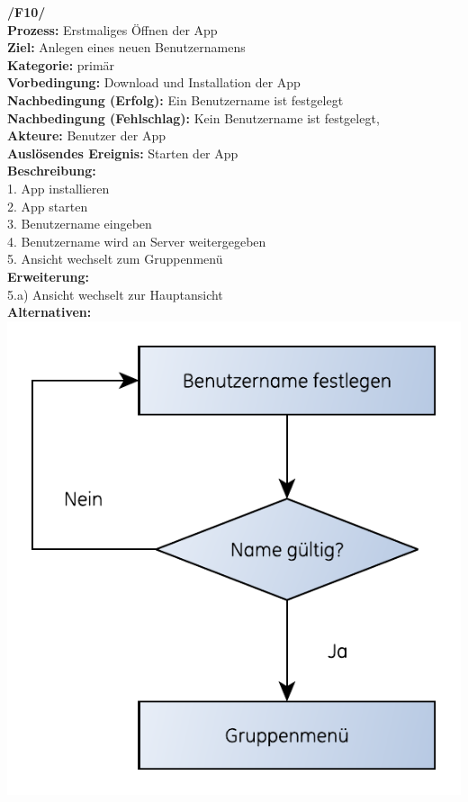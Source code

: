 \documentclass{article}
\begin{document}
\textbf{/F10/} \\
\textbf{Prozess:} Erstmaliges Öffnen der App \\
\textbf{Ziel:} Anlegen eines neuen Benutzernamens \\
\textbf{Kategorie:} primär \\
\textbf{Vorbedingung:} Download und Installation der App \\
\textbf{Nachbedingung (Erfolg):} Ein Benutzername ist festgelegt \\
\textbf{Nachbedingung (Fehlschlag):} Kein Benutzername ist festgelegt,\\
\textbf{Akteure:} Benutzer der App \\
\textbf{Auslösendes Ereignis:} Starten der App\\
\textbf{Beschreibung:} \\
1. App installieren \\
2. App starten       \\
3. Benutzername eingeben \\
4. Benutzername wird an Server weitergegeben \\
5. Ansicht wechselt zum Gruppenmenü \\
\textbf{Erweiterung:} \\
5.a) Ansicht wechselt zur Hauptansicht\\
\textbf{Alternativen:} \\

\includegraphics[scale=0.8]{erstmaliges-starten.pdf}
\end{document}
